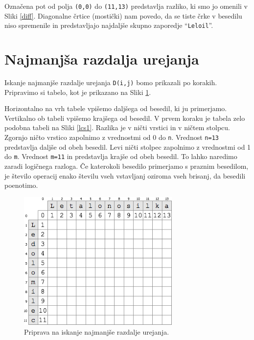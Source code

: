 \documentclass[a4paper, 12pt, twoside]{book}
\begin{document}
Označena pot od polja {\tt (0,0)} do {\tt (11,13)} predstavlja razliko, ki smo jo omenili v Sliki \ref{diff}. Diagonalne črtice (mostički) nam povedo, da se tiste črke v besedilu niso spremenile in predstavljajo najdaljše skupno zaporedje “{\tt Leloil}”.

\section{Najmanjša razdalja urejanja}
\label{sec:med}

Iskanje najmanjše razdalje urejanja {\tt D(i,j)} bomo prikazali po korakih. Pripravimo si tabelo, kot je prikazano na Sliki \ref{med1}.

Horizontalno na vrh tabele vpišemo daljšega od besedil, ki ju primerjamo. Vertikalno ob tabeli vpišemo krajšega od besedil. V prvem koraku je tabela zelo podobna tabeli na Sliki \ref{lcs1}. Razlika je v ničti vrstici in v ničtem stolpcu. Zgornjo ničto vrstico zapolnimo z vrednostmi od 0 do {\tt n}. Vrednost {\tt n=13} predstavlja daljše od obeh besedil. Levi ničti stolpec zapolnimo z vrednostmi od 1 do {\tt m}. Vrednost {\tt m=11} in predstavlja krajše od obeh besedil. To lahko naredimo zaradi logičnega razloga. Če katerokoli besedilo primerjamo s praznim besedilom, je število operacij enako številu vseh vstavljanj oziroma vseh brisanj, da besedili poenotimo.

\begin{figure}[placement h]
\begin{center}
\includegraphics[width=8cm]{med1.png}
\end{center}
\caption{Priprava na iskanje najmanjše razdalje urejanja.}
\label{med1}
\end{figure}
\end{document}
